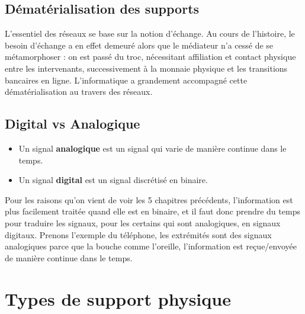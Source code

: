 \documentclass[12pt,a4paper]{report}
\begin{document}
\subsection{Dématérialisation des supports}
L'essentiel des réseaux se base sur la notion d'échange. Au cours de l'histoire, le besoin d'échange a en effet demeuré alors que le médiateur n'a cessé de se métamorphoser : on est passé du troc, nécessitant affiliation et contact physique entre les intervenants, successivement à la monnaie physique et les transitions bancaires en ligne. L'informatique a grandement accompagné cette dématérialisation au travers des réseaux.
\subsection{Digital vs Analogique}
\begin{itemize}
\item Un signal \textbf{analogique} est un signal qui varie de manière continue dans le temps.
\item Un signal \textbf{digital} est un signal discrétisé en binaire.
\end{itemize}
Pour les raisons qu'on vient de voir les 5 chapitres précédents, l'information est plus facilement traitée quand elle est en binaire, et il faut donc prendre du temps pour traduire les signaux, pour les certains qui sont analogiques, en signaux digitaux. Prenons l'exemple du téléphone, les extrémités sont des signaux analogiques parce que la bouche comme l'oreille, l'information est reçue/envoyée de manière continue dans le temps.
\section{Types de support physique}
\end{document}
